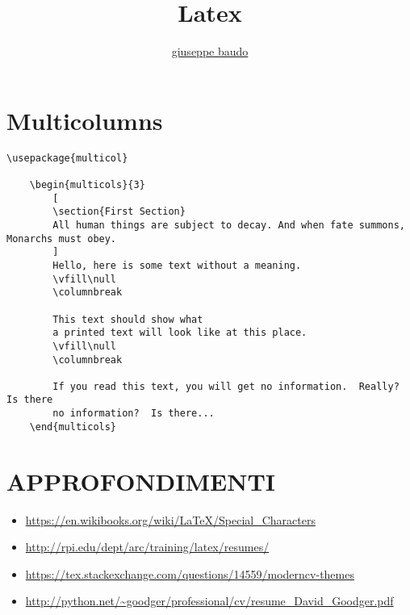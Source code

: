 \documentclass[a4paper,10pt]{article}
\title{Latex}
\author{\href{http://www.baudo.hol.es}{giuseppe baudo}}
\begin{document}
\maketitle

\section{Multicolumns}

\begin{verbatim}
\usepackage{multicol}

	\begin{multicols}{3}
		[
		\section{First Section}
		All human things are subject to decay. And when fate summons, Monarchs must obey.
		]
		Hello, here is some text without a meaning.  
		\vfill\null			
		\columnbreak
		
		This text should show what 
		a printed text will look like at this place.
		\vfill\null
		\columnbreak		
		
		If you read this text, you will get no information.  Really?  Is there 
		no information?  Is there...
	\end{multicols}
\end{verbatim}


\section{APPROFONDIMENTI}
\begin{itemize}
 \item \url{https://en.wikibooks.org/wiki/LaTeX/Special_Characters}
 \item \url{http://rpi.edu/dept/arc/training/latex/resumes/}
 \item \url{https://tex.stackexchange.com/questions/14559/moderncv-themes}
 \item \url{http://python.net/~goodger/professional/cv/resume_David_Goodger.pdf}
\end{itemize}
\end{document}
